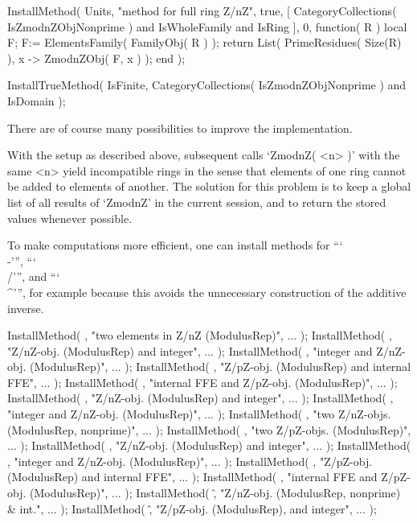     InstallMethod( Units,
        "method for full ring Z/nZ",
        true,
        [     CategoryCollections( IsZmodnZObjNonprime )
          and IsWholeFamily and IsRing ],
        0,
        function( R )
        local F;
        F:= ElementsFamily( FamilyObj( R ) );
        return List( PrimeResidues( Size(R) ), x -> ZmodnZObj( F, x ) );
        end );

    InstallTrueMethod( IsFinite,
        CategoryCollections( IsZmodnZObjNonprime ) and IsDomain );
\endtt



There are of course many possibilities to improve the implementation.

With the setup as described above,
subsequent calls `ZmodnZ( <n> )' with the same <n> yield incompatible
rings in the sense that elements of one ring cannot be added to elements
of another.
The solution for this problem is to keep a global list of all results of
`ZmodnZ' in the current {\GAP} session, and to return the stored values
whenever possible.

To make computations more efficient,
one can install methods for ```\\-''', ```\\/''', and ```\\^''',
for example because this avoids the unnecessary construction of the
additive inverse.

\begintt
    InstallMethod( \-, "two elements in Z/nZ (ModulusRep)", ... );
    InstallMethod( \-, "Z/nZ-obj. (ModulusRep) and integer", ... );
    InstallMethod( \-, "integer and Z/nZ-obj. (ModulusRep)", ... );
    InstallMethod( \-, "Z/pZ-obj. (ModulusRep) and internal FFE", ... );
    InstallMethod( \-, "internal FFE and Z/pZ-obj. (ModulusRep)", ... );
    InstallMethod( \*, "Z/nZ-obj. (ModulusRep) and integer", ... );
    InstallMethod( \*, "integer and Z/nZ-obj. (ModulusRep)", ... );
    InstallMethod( \/, "two Z/nZ-objs. (ModulusRep, nonprime)", ... );
    InstallMethod( \/, "two Z/pZ-objs. (ModulusRep)", ... );
    InstallMethod( \/, "Z/nZ-obj. (ModulusRep) and integer", ... );
    InstallMethod( \/, "integer and Z/nZ-obj. (ModulusRep)", ... );
    InstallMethod( \/, "Z/pZ-obj. (ModulusRep) and internal FFE", ... );
    InstallMethod( \/, "internal FFE and Z/pZ-obj. (ModulusRep)", ... );
    InstallMethod( \^, "Z/nZ-obj. (ModulusRep, nonprime) & int.", ... );
    InstallMethod( \^, "Z/pZ-obj. (ModulusRep), and integer", ... );
\endtt

